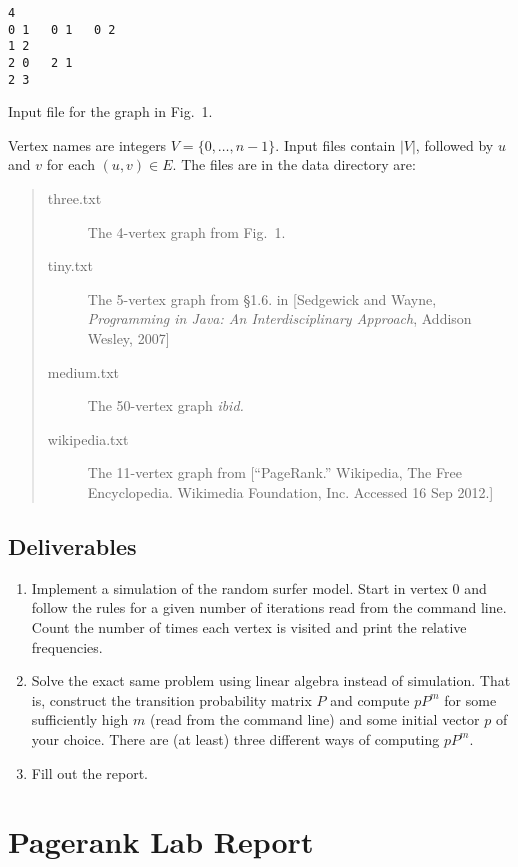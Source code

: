 \documentclass{tufte-handout}
\begin{document}
\begin{marginfigure}
\begin{verbatim}
4
0 1   0 1   0 2
1 2   
2 0   2 1
2 3
\end{verbatim}
\caption{Input file for the graph in Fig.~1.}
\end{marginfigure}

Vertex names are integers $V= \{0,\ldots, n-1\}$.
Input files contain $|V|$, followed by $u$ and $v$ for each $(u,v)\in
E$.
The files are in the data directory are:
\begin{quotation}
\begin{description}
\item[three.txt] The 4-vertex graph from Fig.~1.
\item[tiny.txt] The 5-vertex graph from \S{}1.6. in [Sedgewick and Wayne,
  \emph{Programming in Java: An Interdisciplinary Approach}, Addison
  Wesley, 2007]
\item[medium.txt] The 50-vertex graph \emph{ibid.}
\item[wikipedia.txt] The 11-vertex graph from
  [``PageRank.'' Wikipedia, The Free Encyclopedia. Wikimedia
  Foundation, Inc. Accessed 16 Sep 2012.]
\end{description}
\end{quotation}

\subsection{Deliverables}

\begin{enumerate}
\item Implement a simulation of the random surfer model. 
  Start in
  vertex 0 and follow the rules for a given number of iterations read
  from the command line. Count the number of times each vertex is
  visited and print the relative frequencies.
\item Solve the exact same problem using linear algebra instead of
  simulation.
  That is, construct the transition probability matrix $P$ and
  compute $pP^m$ for some sufficiently high $m$ (read from the command
  line) and some initial vector $p$ of your choice.
  There are (at least) three different ways of computing $p P^m$.
\item Fill out the report.
\end{enumerate}


\newpage
\section{Pagerank Lab Report}
\end{document}
